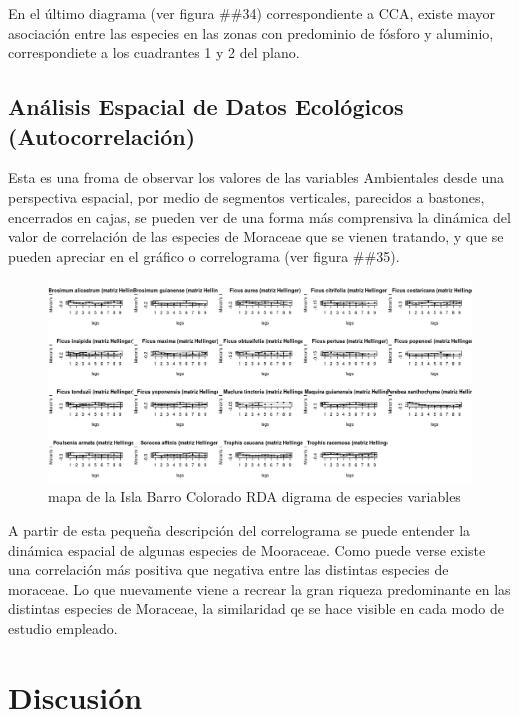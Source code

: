 \documentclass[11pt,]{article}
\begin{document}
En el último diagrama (ver figura \#\#34) correspondiente a CCA, existe
mayor asociación entre las especies en las zonas con predominio de
fósforo y aluminio, correspondiete a los cuadrantes 1 y 2 del plano.

\subsection{Análisis Espacial de Datos Ecológicos
(Autocorrelación)}\label{anuxe1lisis-espacial-de-datos-ecoluxf3gicos-autocorrelaciuxf3n}

Esta es una froma de observar los valores de las variables Ambientales
desde una perspectiva espacial, por medio de segmentos verticales,
parecidos a bastones, encerrados en cajas, se pueden ver de una forma
más comprensiva la dinámica del valor de correlación de las especies de
Moraceae que se vienen tratando, y que se pueden apreciar en el gráfico
o correlograma (ver figura \#\#35).

\begin{figure}
\centering
\includegraphics[width=1.00000\textwidth]{multiples_especies.png}
\caption{mapa de la Isla Barro Colorado RDA digrama de especies
variables\label{fig:bci_map}}
\end{figure}

A partir de esta pequeña descripción del correlograma se puede entender
la dinámica espacial de algunas especies de Mooraceae. Como puede verse
existe una correlación más positiva que negativa entre las distintas
especies de moraceae. Lo que nuevamente viene a recrear la gran riqueza
predominante en las distintas especies de Moraceae, la similaridad qe se
hace visible en cada modo de estudio empleado.

\section{Discusión}\label{discusiuxf3n}
\end{document}
